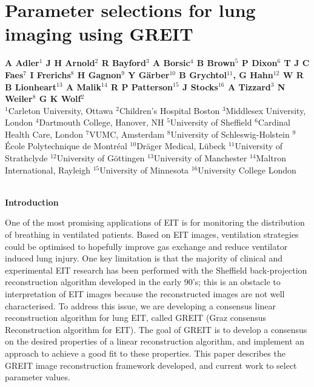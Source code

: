 \documentclass[12pt]{article}
\newcommand{\mysection}[1]{
~\\ \noindent
{\bf \normalsize #1}
\vspace{1mm}
}
\begin{document}
\renewcommand\refname{}


\section*{%
Parameter selections for lung imaging using GREIT
}

\begin{list}{}{\setlength\leftmargin{25mm}}
\item[]\raggedright
 \footnotesize
{\bf
        A Adler$^{1}$
        J H Arnold$^{2}$
        R Bayford$^{3}$
        A Borsic$^{4}$
        B Brown$^{5}$
        P Dixon$^{6}$
        T J C Faes$^{7}$
        I Frerichs$^{8}$
        H Gagnon$^{9}$
        Y G\"arber$^{10}$
        B Grychtol$^{11}$, 
        G Hahn$^{12}$
        W R B Lionheart$^{13}$
        A Malik$^{14}$
        R P Patterson$^{15}$
        J Stocks$^{16}$
        A Tizzard$^{3}$
        N Weiler$^{8}$
        G K Wolf$^{2}$
}
\\
          $^{1}$Carleton University, Ottawa
          $^{2}$Children's Hospital Boston
          $^{3}$Middlesex University, London
          $^{4}$Dartmouth College, Hanover, NH
          $^{5}$University of Sheffield
          $^{6}$Cardinal Health Care, London
          $^{7}$VUMC, Amsterdam
          $^{8}$University of Schleswig-Holstein
          $^{9}$\'Ecole Polytechnique de Montr\'eal
         $^{10}$Dr\"ager Medical, L\"ubeck
         $^{11}$University of Strathclyde
         $^{12}$University of G\"ottingen
         $^{13}$University of Manchester
         $^{14}$Maltron International, Rayleigh
         $^{15}$University of Minnesota
         $^{16}$University College London
\end{list}

\vspace{-5mm}
\small
\mysection{Introduction}

One of the most promising applications of EIT is for
monitoring the distribution of breathing in ventilated
patients. Based on EIT images, ventilation strategies could
be optimised to hopefully improve gas exchange and reduce
ventilator induced lung injury. One key limitation is that
the majority of clinical and experimental EIT research
has been performed with the Sheffield back-projection
reconstruction algorithm developed in the early 90's; this
is an obstacle to interpretation of EIT images because
the reconstructed images are not well characterised. To
address this issue, we are developing a consensus linear
reconstruction algorithm for lung EIT, called GREIT (Graz
consensus Reconstruction algorithm for EIT).  The goal of
GREIT is to develop a consensus on the desired properties
of a linear reconstruction algorithm, and implement an
approach to achieve a good fit to these properties.
This paper describes the GREIT image reconstruction
framework developed, and
current work to select parameter values.
\end{document}
